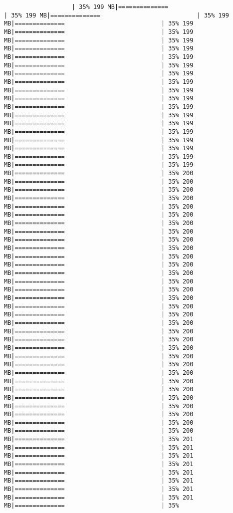 \documentclass[
]{article}
\begin{document}
\begin{verbatim}
                   | 35% 199 MB|==============                           | 35% 199 MB|==============                           | 35% 199 MB|==============                           | 35% 199 MB|==============                           | 35% 199 MB|==============                           | 35% 199 MB|==============                           | 35% 199 MB|==============                           | 35% 199 MB|==============                           | 35% 199 MB|==============                           | 35% 199 MB|==============                           | 35% 199 MB|==============                           | 35% 199 MB|==============                           | 35% 199 MB|==============                           | 35% 199 MB|==============                           | 35% 199 MB|==============                           | 35% 199 MB|==============                           | 35% 199 MB|==============                           | 35% 199 MB|==============                           | 35% 199 MB|==============                           | 35% 199 MB|==============                           | 35% 199 MB|==============                           | 35% 200 MB|==============                           | 35% 200 MB|==============                           | 35% 200 MB|==============                           | 35% 200 MB|==============                           | 35% 200 MB|==============                           | 35% 200 MB|==============                           | 35% 200 MB|==============                           | 35% 200 MB|==============                           | 35% 200 MB|==============                           | 35% 200 MB|==============                           | 35% 200 MB|==============                           | 35% 200 MB|==============                           | 35% 200 MB|==============                           | 35% 200 MB|==============                           | 35% 200 MB|==============                           | 35% 200 MB|==============                           | 35% 200 MB|==============                           | 35% 200 MB|==============                           | 35% 200 MB|==============                           | 35% 200 MB|==============                           | 35% 200 MB|==============                           | 35% 200 MB|==============                           | 35% 200 MB|==============                           | 35% 200 MB|==============                           | 35% 200 MB|==============                           | 35% 200 MB|==============                           | 35% 200 MB|==============                           | 35% 200 MB|==============                           | 35% 200 MB|==============                           | 35% 200 MB|==============                           | 35% 200 MB|==============                           | 35% 200 MB|==============                           | 35% 201 MB|==============                           | 35% 201 MB|==============                           | 35% 201 MB|==============                           | 35% 201 MB|==============                           | 35% 201 MB|==============                           | 35% 201 MB|==============                           | 35% 201 MB|==============                           | 35% 201 MB|==============                           | 35% 
\end{verbatim}
\end{document}
